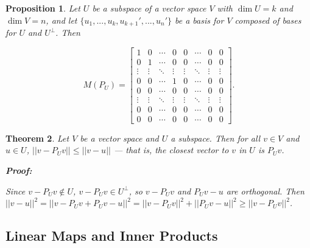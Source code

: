 \documentclass{article}
\theoremstyle{colontheorem}
\newtheorem{theorem}{Theorem}[section]
\newtheorem{proposition}[theorem]{Proposition}
\newenvironment{Theorem}
{
	\begin{mdframed}[backgroundcolor=TheoremOrange!10]
	\begin{theorem}
}
{
	\end{theorem}
	\end{mdframed}
	
	\vspace{.15in}
}
\newenvironment{Proposition}
{
	\begin{mdframed}[backgroundcolor=TheoremOrange!10]
	\begin{proposition}
}
{
	\end{proposition}
	\end{mdframed}
	
	\vspace{.15in}
}
\newenvironment{Proof}
{
	\begin{mdframed}[backgroundcolor=ProofPurple!10]
	\textbf{Proof:}%
}
{
	\end{mdframed}
	
	\vspace{.085in}
}
\begin{document}
\begin{Proposition}
	
	Let $U$ be a subspace of a vector space $V$ with $\dim U = k$ and $\dim V = n$, and let $\{u_1, ..., u_k, u_{k+1}', ..., u_n'\}$ be a basis for $V$ composed of bases for $U$ and $U^\perp$. Then
	
	$$
		M(P_U) = \begin{bmatrix}
			1 & 0 & \cdots & 0 & 0 & \cdots & 0 & 0\\
			0 & 1 & \cdots & 0 & 0 & \cdots & 0 & 0\\
			\vdots & \vdots & \ddots & \vdots & \vdots & \ddots & \vdots & \vdots\\
			0 & 0 & \cdots & 1 & 0 & \cdots & 0 & 0\\
			0 & 0 & \cdots & 0 & 0 & \cdots & 0 & 0\\
			\vdots & \vdots & \ddots & \vdots & \vdots & \ddots & \vdots & \vdots\\
			0 & 0 & \cdots & 0 & 0 & \cdots & 0 & 0\\
			0 & 0 & \cdots & 0 & 0 & \cdots & 0 & 0
		\end{bmatrix}.
	$$
	
\end{Proposition}



\begin{Theorem}
	
	Let $V$ be a vector space and $U$ a subspace. Then for all $v \in V$ and $u \in U$, $||v - P_U v|| \leq ||v - u||$ --- that is, the closest vector to $v$ in $U$ is $P_U v$.
	
	\begin{Proof}
		Since $v - P_U v \notin U$, $v - P_U v \in U^\perp$, so $v - P_U v$ and $P_U v - u$ are orthogonal. Then $||v - u||^2 = ||v - P_U v + P_U v - u||^2 = ||v - P_U v||^2 + ||P_U v - u||^2 \geq ||v - P_U v||^2$.
		
	\end{Proof}
	
\end{Theorem}





\begin{center}
	\pagebreak
	
	\section{Linear Maps and Inner Products}
	
	\vspace{.1in}
\end{center}
\end{document}
